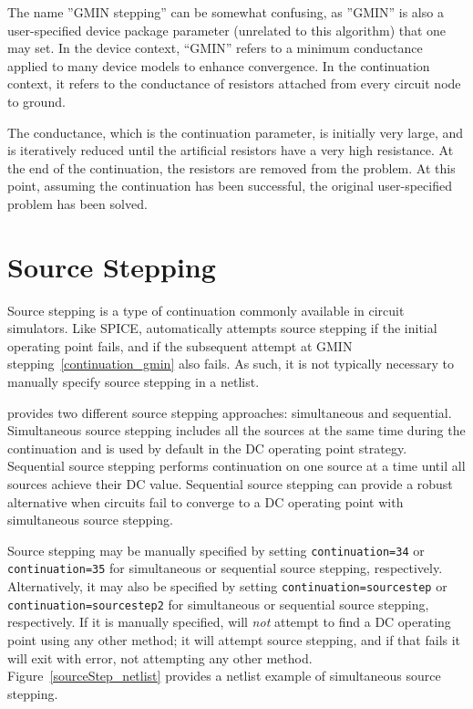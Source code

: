 The name ''GMIN stepping'' can be somewhat confusing, as ''GMIN'' is
also a user-specified device package parameter (unrelated to this
algorithm) that one may set.  In the device context, ``GMIN'' refers to
a minimum conductance applied to many device models to enhance
convergence.  In the continuation context, it refers to the conductance of
resistors attached from every circuit node to ground.

The conductance, which is the continuation parameter, is initially
very large, and is iteratively reduced until the artificial resistors
have a very high resistance. At the end of the continuation, the
resistors are removed from the problem. At this point, assuming the
continuation has been successful, the original user-specified problem
has been solved.

\newpage 
\section{Source Stepping}
\label{continuation_source}

Source stepping is a type of continuation commonly available in circuit simulators.
Like SPICE, \Xyce{} automatically attempts source stepping if the initial
operating point fails, and if the subsequent attempt at GMIN stepping~\ref{continuation_gmin} 
also fails.  As such, it is not typically necessary to manually 
specify source stepping in a \Xyce{} netlist.  

\Xyce{} provides two different source stepping approaches:  simultaneous and sequential.  
Simultaneous source stepping includes all the sources at the same time during the 
continuation and is used by default in the DC operating point strategy.  
Sequential source stepping performs continuation on one source at a time until all sources 
achieve their DC value.  Sequential source stepping can provide a robust alternative
when circuits fail to converge to a DC operating point with simultaneous source stepping.

Source stepping may be manually specified by setting
\texttt{continuation=34} or \texttt{continuation=35} for simultaneous or sequential source
stepping, respectively.  Alternatively, it may also be specified by setting \texttt{continuation=sourcestep}
or \texttt{continuation=sourcestep2} for simultaneous or sequential source stepping, respectively. 
If it is manually specified,\Xyce{} will \emph{not} attempt to find a DC operating 
point using any other method; it will attempt source stepping, and if that fails 
it will exit with error, not attempting any other method. 
Figure~\ref{sourceStep_netlist} provides a netlist example of simultaneous source stepping.

